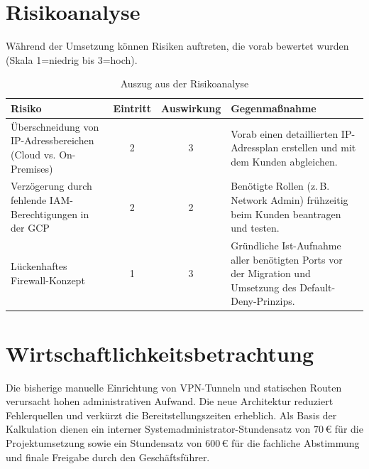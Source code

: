 \section{Risikoanalyse}
Während der Umsetzung können Risiken auftreten, die vorab bewertet wurden (Skala 1=niedrig bis 3=hoch).

\begin{table}[!ht]
\centering
\begin{tabularx}{\textwidth}{|X|c|c|X|}
\hline
\textbf{Risiko} & \textbf{Eintritt} & \textbf{Auswirkung} & \textbf{Gegenmaßnahme} \\ \hline

Überschneidung von IP-Adressbereichen (Cloud vs. On-Premises) 
& \cellcolor{gyellow!40} 2 
& \cellcolor{gred!30} 3    
& Vorab einen detaillierten IP-Adressplan erstellen und mit dem Kunden abgleichen. \\ \hline

Verzögerung durch fehlende IAM-Berechtigungen in der GCP 
& \cellcolor{gyellow!40} 2 
& \cellcolor{gyellow!40} 2 
& Benötigte Rollen (z.\,B. Network Admin) frühzeitig beim Kunden beantragen und testen. \\ \hline

Lückenhaftes Firewall-Konzept 
& \cellcolor{ggreen!30} 1  
& \cellcolor{gred!30} 3 
& Gründliche Ist-Aufnahme aller benötigten Ports vor der Migration und Umsetzung des Default-Deny-Prinzips. \\ \hline

\end{tabularx}
\caption{Auszug aus der Risikoanalyse}
\end{table}

\section{Wirtschaftlichkeitsbetrachtung}
Die bisherige manuelle Einrichtung von VPN-Tunneln und statischen Routen verursacht hohen administrativen Aufwand. Die neue Architektur reduziert Fehlerquellen und verkürzt die Bereitstellungszeiten erheblich. Als Basis der Kalkulation dienen ein interner Systemadministrator-Stundensatz von 70\,€ für die Projektumsetzung sowie ein Stundensatz von 600\,€ für die fachliche Abstimmung und finale Freigabe durch den Geschäftsführer.

